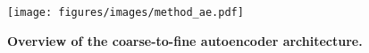 \begin{figure}[h!]
    \centering
    \texttt{[image: figures/images/method\_ae.pdf]}
    \caption{\textbf{Overview of the coarse-to-fine autoencoder architecture.}}
    \label{fig:method_ae}
\end{figure}